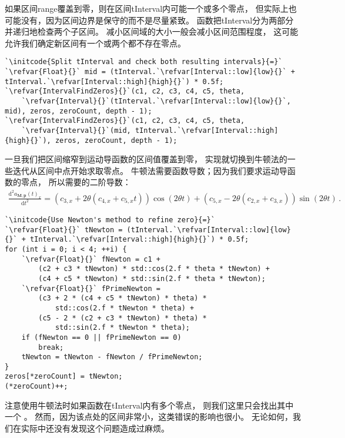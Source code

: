 如果区间{\ttfamily range}覆盖到零，则在区间{\ttfamily tInterval}内可能一个或多个零点，
但实际上也可能没有，因为区间边界是保守的而不是尽量紧致。
函数把{\ttfamily tInterval}分为两部分并递归地检查两个子区间。
减小区间域的大小一般会减小区间范围程度，
这可能允许我们确定新区间有一个或两个都不存在零点。
\begin{lstlisting}
`\initcode{Split tInterval and check both resulting intervals}{=}`
`\refvar{Float}{}` mid = (tInterval.`\refvar[Interval::low]{low}{}` + tInterval.`\refvar[Interval::high]{high}{}`) * 0.5f;
`\refvar{IntervalFindZeros}{}`(c1, c2, c3, c4, c5, theta,
    `\refvar{Interval}{}`(tInterval.`\refvar[Interval::low]{low}{}`, mid), zeros, zeroCount, depth - 1);
`\refvar{IntervalFindZeros}{}`(c1, c2, c3, c4, c5, theta,
    `\refvar{Interval}{}`(mid, tInterval.`\refvar[Interval::high]{high}{}`), zeros, zeroCount, depth - 1);
\end{lstlisting}

一旦我们把区间缩窄到运动导函数的区间值覆盖到零，
实现就切换到牛顿法的一些迭代从区间中点开始求取零点。
牛顿法需要函数导数；因为我们要求运动导函数的零点，
所以需要的二阶导数：
\begin{align*}
    \frac{\mathrm{d}^2a_{\bm M,\bm p}(t)_x}{\mathrm{d}t^2}=(c_{3,x}+2\theta(c_{4,x}+c_{5,x}t))\cos(2\theta t)+(c_{5,x}-2\theta(c_{2,x}+c_{3,x}))\sin(2\theta t)\, .
\end{align*}

\begin{lstlisting}
`\initcode{Use Newton's method to refine zero}{=}`
`\refvar{Float}{}` tNewton = (tInterval.`\refvar[Interval::low]{low}{}` + tInterval.`\refvar[Interval::high]{high}{}`) * 0.5f;
for (int i = 0; i < 4; ++i) {
    `\refvar{Float}{}` fNewton = c1 +
        (c2 + c3 * tNewton) * std::cos(2.f * theta * tNewton) +
        (c4 + c5 * tNewton) * std::sin(2.f * theta * tNewton);
    `\refvar{Float}{}` fPrimeNewton =
        (c3 + 2 * (c4 + c5 * tNewton) * theta) *
            std::cos(2.f * tNewton * theta) +
        (c5 - 2 * (c2 + c3 * tNewton) * theta) *
            std::sin(2.f * tNewton * theta);
    if (fNewton == 0 || fPrimeNewton == 0)
        break;
    tNewton = tNewton - fNewton / fPrimeNewton;
}
zeros[*zeroCount] = tNewton;
(*zeroCount)++;
\end{lstlisting}

注意使用牛顿法时如果函数在{\ttfamily tInterval}内有多个零点，
则我们这里只会找出其中一个
。
然而，因为该点处的区间非常小，这类错误的影响也很小。
无论如何，我们在实际中还没有发现这个问题造成过麻烦。